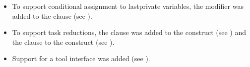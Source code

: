 \begin{itemize}
\item To support conditional assignment to lastprivate variables, the
 modifier was added to the  clause (see
).

\item To support task reductions, the 
clause was added to the  construct (see ) and the 
clause to the  construct (see ).

\item Support for a tool interface was added (see ).

\end{itemize}


